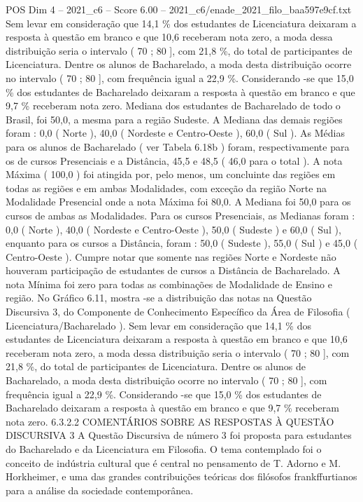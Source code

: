 \begin{textsample}{POS Dim 4 – 2021\_c6 – Score 6.00 – 2021\_c6/enade\_2021\_filo\_baa597e9cf.txt}
Sem levar em consideração que 14,1 \% dos estudantes de Licenciatura deixaram a resposta à questão em branco e que 10,6 receberam nota zero, a moda dessa distribuição seria o intervalo ( 70 ; 80 ], com 21,8 \%, do total de participantes de Licenciatura.
Dentre os alunos de Bacharelado, a moda desta distribuição ocorre no intervalo ( 70 ; 80 ], com frequência igual a 22,9 \%.
Considerando -se que 15,0 \% dos estudantes de Bacharelado deixaram a resposta à questão em branco e que 9,7 \% receberam nota zero.
Mediana dos estudantes de Bacharelado de todo o Brasil, foi 50,0, a mesma para a região Sudeste.
A Mediana das demais regiões foram : 0,0 ( Norte ), 40,0 ( Nordeste e Centro-Oeste ), 60,0 ( Sul ).
As Médias para os alunos de Bacharelado ( ver Tabela 6.18b ) foram, respectivamente para os de cursos Presenciais e a Distância, 45,5 e 48,5 ( 46,0 para o total ).
A nota Máxima ( 100,0 ) foi atingida por, pelo menos, um concluinte das regiões em todas as regiões e em ambas Modalidades, com exceção da região Norte na Modalidade Presencial onde a nota Máxima foi 80,0.
A Mediana foi 50,0 para os cursos de ambas as Modalidades.
Para os cursos Presenciais, as Medianas foram : 0,0 ( Norte ), 40,0 ( Nordeste e Centro-Oeste ), 50,0 ( Sudeste ) e 60,0 ( Sul ), enquanto para os cursos a Distância, foram : 50,0 ( Sudeste ), 55,0 ( Sul ) e 45,0 ( Centro-Oeste ).
Cumpre notar que somente nas regiões Norte e Nordeste não houveram participação de estudantes de cursos a Distância de Bacharelado.
A nota Mínima foi zero para todas as combinações de Modalidade de Ensino e região.
No Gráfico 6.11, mostra -se a distribuição das notas na Questão Discursiva 3, do Componente de Conhecimento Específico da Área de Filosofia ( Licenciatura/Bacharelado ).
Sem levar em consideração que 14,1 \% dos estudantes de Licenciatura deixaram a resposta à questão em branco e que 10,6 receberam nota zero, a moda dessa distribuição seria o intervalo ( 70 ; 80 ], com 21,8 \%, do total de participantes de Licenciatura.
Dentre os alunos de Bacharelado, a moda desta distribuição ocorre no intervalo ( 70 ; 80 ], com frequência igual a 22,9 \%.
Considerando -se que 15,0 \% dos estudantes de Bacharelado deixaram a resposta à questão em branco e que 9,7 \% receberam nota zero. 6.3.2.2 COMENTÁRIOS SOBRE AS RESPOSTAS À QUESTÃO DISCURSIVA 3 A Questão Discursiva de número 3 foi proposta para estudantes do Bacharelado e da Licenciatura em Filosofia.
O tema contemplado foi o conceito de indústria cultural que é central no pensamento de T.
Adorno e M.
Horkheimer, e uma das grandes contribuições teóricas dos filósofos frankffurtianos para a análise da sociedade contemporânea.

\end{textsample}
